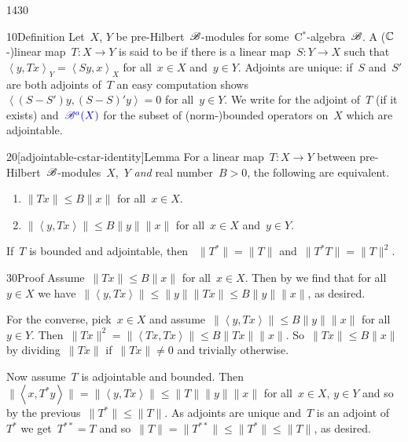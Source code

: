 \begin{parsec}{1430}%
\begin{point}{10}{Definition}%
Let~$X$, $Y$ be pre-Hilbert~$\mathscr{B}$-modules
    for some~C$^*$-algebra~$\mathscr{B}$.
    A ($\mathbb{C}$-)linear map~$T\colon X \to Y$
    is said to be 
    if there is a linear map~$S \colon Y \to X$
    such that~$\left<y, Tx\right>_Y = \left<Sy, x\right>_X$
    for all~$x \in X$ and~$y \in Y$.
Adjoints are unique:
    if~$S$ and~$S'$ are both adjoints of~$T$
    an easy computation shows~$\left<(S-S')y,(S-S)'y\right>=0$
    for all~$y \in Y$.
We write  for the adjoint of~$T$ (if it exists)
and~$\Define{\scrB^a(X)}$
    for the subset of (norm-)bounded operators on~$X$
    which are adjointable.
\end{point}
\begin{point}{20}[adjointable-cstar-identity]{Lemma}%
For a linear map~$T \colon X \to Y$
between pre-Hilbert~$\mathscr{B}$-modules~$X$,~$Y$ \emph{and}
real number~$B > 0$,
the following are equivalent.
\begin{enumerate}
    \item $\|T x\| \leq B \|x\|$ for all~$x \in X$.
    \item $\|\left<y,Tx\right>\| \leq B \|y\|\|x\|$
            for all~$x \in X$ and~$y \in Y$.
\end{enumerate}
If~$T$ is bounded and adjointable, then 
    ~$\|T^*\| = \|T\|$ and~$\|T^*T\|=\|T\|^2$.
\begin{point}{30}{Proof}%
   Assume~$\|Tx\| \leq B \|x\|$ for all~$x \in X$.
   Then by 
   we find that for all~$y \in X$ we have~$\|\left<y, Tx\right>\|
            \leq \|y\|\|Tx\|
            \leq B \|y\|\|x\|$, as desired.

For the converse, pick~$x\in X$
    and assume~$\|\left<y,Tx\right>\| \leq B \|y\|\|x\|$
            for all~$y \in Y$.
Then~$\|Tx \|^2 = \|\left<Tx,Tx\right>\|
                \leq B\|Tx\|\|x\|$.
So~$\|Tx\| \leq B\|x\|$
    by dividing~$\|Tx\|$ if~$\|Tx\|\neq0$
    and trivially otherwise.

Now assume~$T$ is adjointable and bounded.
Then~$\|\left<x,T^*y\right>\| = \|\left<y, Tx\right>\| \leq \|T\|\|y\|\|x\|$
    for all~$x \in X$, $y\in Y$
    and so by the previous~$\| T^*\| \leq \|T\|$.
As adjoints are unique and~$T$ is an adjoint of~$T^*$
    we get~$T^{**}=T$
    and so~$\|T\| = \|T^{**}\| \leq \|T^*\| \leq \|T\|$, as desired.


\end{point}
\end{point}
\end{parsec}
